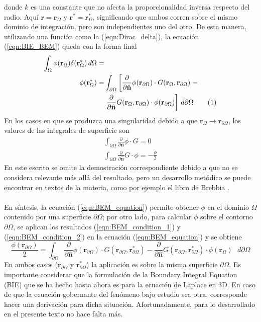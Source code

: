 \documentclass[12pt, twoside, onehalfspace, numbers, spanish]{ezthesis}
\newcommand\numberthis{\addtocounter{equation}{1}\tag{\theequation}}
\numberwithin{equation}{section}
\begin{document}
donde $k$ es una constante que no afecta la proporcionalidad inversa respecto del radio. Aquí $\mathbf{r} = \mathbf{r}_\Omega$ y $\mathbf{r}^* = \mathbf{r}_\Omega^*$, significando que ambos corren sobre el mismo dominio de integración, pero son independientes uno del otro. De esta manera, utilizando una función como la (\ref{eqn:Dirac_delta}), la ecuación (\ref{eqn:BIE_BEM}) queda con la forma final
\begin{align*}
\int_\Omega\phi(\mathbf{r}_\Omega)\delta(\mathbf{r}_\Omega^*)\, d\Omega=&\\
\phi(\mathbf{r}_\Omega^*)=&\int_{\partial\Omega}\left[\frac{\partial}{\partial\hat{\mathbf{n}}}\phi(\mathbf{r}_{\partial\Omega})\cdot G(\mathbf{r}_\Omega,\mathbf{r}_{\partial\Omega})\right. -\\ &\left.\frac{\partial}{\partial\hat{\mathbf{n}}}G(\mathbf{r}_\Omega,\mathbf{r}_{\partial\Omega})\cdot\phi(\mathbf{r}_{\partial\Omega})\right]\, d\partial\Omega \numberthis \label{eqn:BEM_equation}
\end{align*}
En los casos en que se produzca una singularidad debido a que $\mathbf{r}_\Omega \rightarrow \mathbf{r}_{\partial\Omega}$, los valores de las integrales de superficie son
\begin{gather}
\int_{\partial\Omega}\frac{\partial}{\partial\hat{\mathbf{n}}}\phi\cdot G = 0 \label{eqn:BEM_condition_1} \\
\int_{\partial\Omega}\frac{\partial}{\partial\hat{\mathbf{n}}} G\cdot\phi = -\frac{\phi}{2} \label{eqn:BEM_condition_2}
\end{gather}
En este escrito se omite la demostración correspondiente debido a que no se considera relevante más allá del resultado, pero un desarrollo metódico se puede encontrar en textos de la materia, como por ejemplo el libro de Brebbia \cite{Brebbia}.\\\\
En síntesis, la ecuación (\ref{eqn:BEM_equation}) permite obtener $\phi$ en el dominio $\Omega$ contenido por una superficie $\partial\Omega$; por otro lado, para calcular $\phi$ sobre el contorno $\partial\Omega$, se aplican los resultados (\ref{eqn:BEM_condition_1}) y (\ref{eqn:BEM_condition_2}) en la ecuación (\ref{eqn:BEM_equation}) y se obtiene
\begin{equation}
\frac{\phi(\mathbf{r}_{\partial\Omega})}{2} = \int_{\partial\Omega}\frac{\partial}{\partial\hat{\mathbf{n}}}\phi(\mathbf{r}_{\partial\Omega})\cdot G(\mathbf{r}_{\partial\Omega},\mathbf{r}_{\partial\Omega}^*) - \frac{\partial}{\partial\hat{\mathbf{n}}}G(\mathbf{r}_{\partial\Omega},\mathbf{r}_{\partial\Omega}^*)\cdot\phi(\mathbf{r}_\Omega)\text{ }d\partial\Omega
\end{equation}
En ambos casos ($\mathbf{r}_{\partial\Omega}$ y $\mathbf{r}_{\partial\Omega}^*$) la aplicación es sobre la misma superficie $\partial\Omega$. Es importante considerar que la formulación de la Boundary Integral Equation (BIE) que se ha hecho hasta ahora es para la ecuación de Laplace en 3D. En caso de que la ecuación gobernante del fenómeno bajo estudio sea otra, corresponde hacer una derivación para dicha situación. Afortunadamente, para lo desarrollado en el presente texto no hace falta más.
\end{document}
